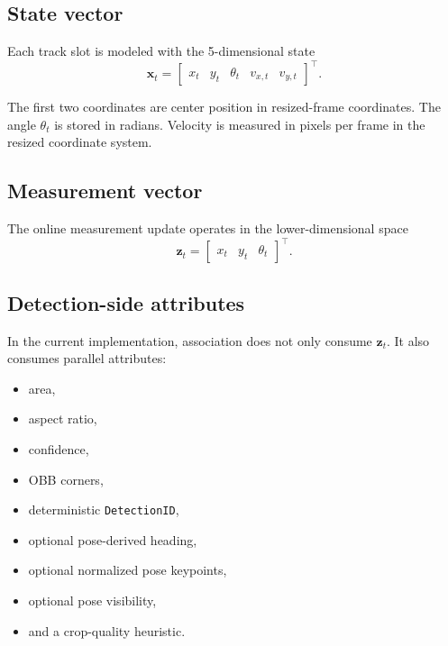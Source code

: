 \documentclass[11pt]{article}
\newcommand{\runtimekey}[1]{\texttt{#1}}
\begin{document}
\subsection{State vector}

Each track slot is modeled with the 5-dimensional state
\begin{equation}
  \mathbf{x}_t = \begin{bmatrix}
    x_t & y_t & \theta_t & v_{x,t} & v_{y,t}
  \end{bmatrix}^{\!\top}.
\end{equation}

The first two coordinates are center position in resized-frame coordinates. The angle $\theta_t$ is stored in radians. Velocity is measured in pixels per frame in the resized coordinate system.

\subsection{Measurement vector}

The online measurement update operates in the lower-dimensional space
\begin{equation}
  \mathbf{z}_t = \begin{bmatrix}
    x_t & y_t & \theta_t
  \end{bmatrix}^{\!\top}.
\end{equation}

\subsection{Detection-side attributes}

In the current implementation, association does not only consume $\mathbf{z}_t$. It also consumes parallel attributes:

\begin{itemize}
  \item area,
  \item aspect ratio,
  \item confidence,
  \item OBB corners,
  \item deterministic \runtimekey{DetectionID},
  \item optional pose-derived heading,
  \item optional normalized pose keypoints,
  \item optional pose visibility,
  \item and a crop-quality heuristic.
\end{itemize}
\end{document}
